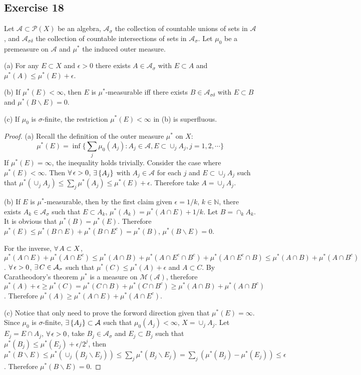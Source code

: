 \subsection*{Exercise 18}
Let $\mathcal{A}\subset\mathcal{P}(X)$ be an algebra, $\mathcal{A}_\sigma$ the collection of countable unions of sets in $\mathcal{A}$, and $\mathcal{A}_{\sigma\delta}$ the collection of countable intersections of sets in $\mathcal{A}_\sigma$. Let $\mu_0$ be a premeasure on $\mathcal{A}$ and $\mu^*$ the induced outer measure.
\par(a) For any $E\subset X$ and $\epsilon>0$ there exists $A\in\mathcal{A}_\sigma$ with $E\subset A$ and $\mu^*(A)\le\mu^*(E)+\epsilon$.
\par(b) If $\mu^*(E)<\infty$, then $E$ is $\mu^*$-measurable iff there exists $B\in\mathcal{A}_{\sigma\delta}$ with $E\subset B$ and $\mu^*(B\backslash E)=0$.
\par(c) If $\mu_0$ is $\sigma$-finite, the restriction $\mu^*(E)<\infty$ in (b) is superfluous.
\begin{proof}
    (a) Recall the definition of the outer measure $\mu^*$ on $X$:
    $$
    \mu^*(E)=\inf\{\sum_j\mu_0(A_j):A_j\in\mathcal{A},E\subset\cup_jA_j,j=1,2,\cdots\}
    $$
    If $\mu^*(E)=\infty$, the inequality holds trivially. Consider the case where $\mu^*(E)<\infty$. Then $\forall\,\epsilon>0$, $\exists\, \{A_j\}$ with $A_j\in\mathcal{A}$ for each $j$ and $E\subset\cup_jA_j$ such that $\mu^*(\cup_jA_j)\le\sum_j\mu^*(A_j)\le\mu^*(E)+\epsilon$. Therefore take $A=\cup_jA_j$.
    \par(b) If $E$ is $\mu^*$-measurable, then by the first claim given $\epsilon=1/k$, $k\in\mathbb{N}$, there exists $A_k\in\mathcal{A}_{\sigma}$ such that $E\subset A_k$, $\mu^*(A_k)=\mu^*(A\cap E)+1/k$. Let $B=\cap_kA_k$. It is obvious that $\mu^*(B)=\mu^*(E)$. Therefore $\mu^*(E)\le\mu^*(B\cap E)+\mu^*(B\cap E^c)=\mu^*(B)$, $\mu^*(B\backslash E)=0$. 
    \par For the inverse, $\forall\, A\subset X$, $\mu^*(A\cap E)+\mu^*(A\cap E^c)\le\mu^*(A\cap B)+\mu^*(A\cap E^c\cap B^c)+\mu^*(A\cap E^c\cap B)\le\mu^*(A\cap B)+\mu^*(A\cap B^c)$. $\forall\, \epsilon>0$, $\exists\, C\in\mathcal{A}_\sigma$ such that $\mu^*(C)\le\mu^*(A)+\epsilon$ and $A\subset C$. By Caratheodory's theorem $\mu^*$ is a measure on $\mathcal{M}(\mathcal{A})$, therefore $\mu^*(A)+\epsilon\ge\mu^*(C)=\mu^*(C\cap B)+\mu^*(C\cap B^c)\ge\mu^*(A\cap B)+\mu^*(A\cap B^c)$. Therefore $\mu^*(A)\ge\mu^*(A\cap E)+\mu^*(A\cap E^c)$.
    \par (c) Notice that only need to prove the forword direction given that $\mu^*(E)=\infty$. Since $\mu_0$ is $\sigma$-finite, $\exists\, \{A_j\}\subset\mathcal{A}$ such that $\mu_0(A_j)<\infty$, $X=\cup_jA_j$. Let $E_j=E\cap A_j$, $\forall\, \epsilon>0$, take $B_j\in\mathcal{A_\sigma}$ and $E_j\subset B_j$ such that $\mu^*(B_j)\le\mu^*(E_j)+\epsilon/2^j$, then $\mu^*(B\backslash E)\le\mu^*(\cup_j(B_j\backslash E_j))\le\sum_j\mu^*(B_j\backslash E_j)=\sum_j(\mu^*(B_j)-\mu^*(E_j))\le\epsilon$. Therefore $\mu^*(B\backslash E)=0$.
\end{proof}
